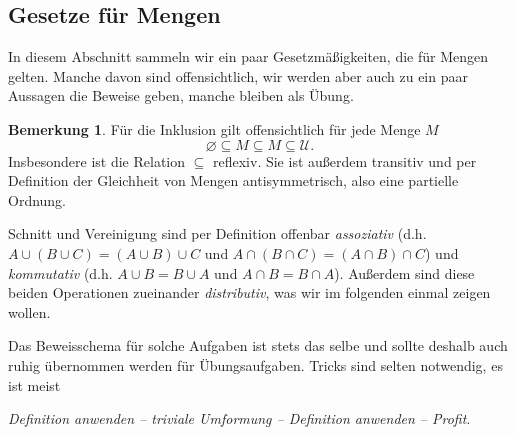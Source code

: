 \documentclass[11pt, a4paper]{article}
\theoremstyle{definition}
\newtheorem*{remark*}{Bemerkung}
\theoremstyle{plain}
\numberwithin{equation}{section}
\let\emptyset\varnothing
\begin{document}
\subsection{Gesetze für Mengen}\label{sec:pre_setlaws}
In diesem Abschnitt sammeln wir ein paar Gesetzmäßigkeiten, die für Mengen gelten. Manche davon sind offensichtlich, wir werden aber auch zu ein paar Aussagen die Beweise geben, manche bleiben als Übung.
\begin{remark*}
	Für die Inklusion gilt offensichtlich für jede Menge $M$
	$$
		\emptyset \subseteq M \subseteq M \subseteq \mathcal{U}.
	$$
	Insbesondere ist die Relation $\subseteq$ reflexiv. Sie ist außerdem transitiv und per Definition der Gleichheit von Mengen antisymmetrisch, also eine partielle Ordnung.\par
	Schnitt und Vereinigung sind per Definition offenbar \textit{assoziativ} (d.h. $A \cup (B \cup C) = (A \cup B) \cup C$ und $A \cap (B \cap C) = (A \cap B) \cap C$) und \textit{kommutativ} (d.h. $A \cup B = B \cup A$ und $A \cap B = B \cap A$). Außerdem sind diese beiden Operationen zueinander \textit{distributiv}, was wir im folgenden einmal zeigen wollen. 
\end{remark*}
Das Beweisschema für solche Aufgaben ist stets das selbe und sollte deshalb auch ruhig übernommen werden für Übungsaufgaben. Tricks sind selten notwendig, es ist meist
\begin{center}
	\textit{Definition anwenden -- triviale Umformung -- Definition anwenden -- Profit}.
\end{center}
\end{document}

